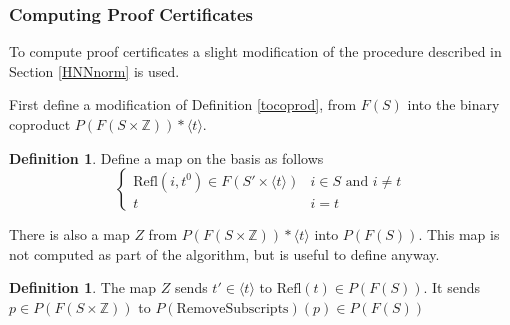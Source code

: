 \documentclass[11pt]{article} %
\theoremstyle{definition}
\theoremstyle{definition}
\theoremstyle{definition}
\theoremstyle{definition}
\theoremstyle{definition}
\newtheorem{defn}[theorem]{Definition}
\theoremstyle{definition}
\begin{document}

\subsubsection{Computing Proof Certificates}\label{HNNPC}

To compute proof certificates a slight modification of the procedure described in Section
\ref{HNNnorm} is used.

First define a modification of Definition \ref{tocoprod}, from $F(S)$ into the binary
coproduct $P(F(S \times \mathbb{Z})) \ast \langle t \rangle$.

\begin{defn}\label{tocoprodP}
  Define a map on the basis as follows
  \begin{equation}
    \begin{cases}
      \text{Refl}(i, t^0) \in F(S' \times \langle t \rangle) & i \in S \text{ and } i \ne t \\
      t & i = t
    \end{cases}
  \end{equation}
\end{defn}

There is also a map $Z$ from $P(F(S \times \mathbb{Z})) \ast \langle t \rangle$ into
$P(F(S))$. This map is not computed as part of the algorithm, but is useful to define anyway.

\begin{defn}
  The map $Z$ sends $t' \in \langle t \rangle$ to $\text{Refl}(t) \in P(F(S))$.
  It sends $p \in P(F(S \times \mathbb{Z}))$ to $P(\text{RemoveSubscripts})(p) \in P(F(S))$
\end{defn}
\end{document}
